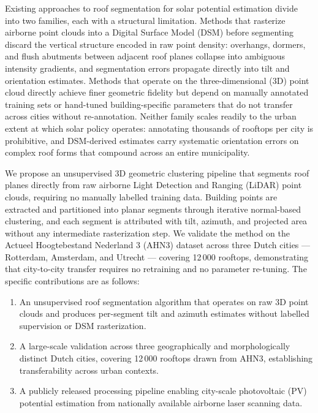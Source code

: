 Existing approaches to roof segmentation for solar potential estimation divide into two
families, each with a structural limitation.
Methods that rasterize airborne point clouds into a Digital Surface Model (DSM) before
segmenting \citep{Jakubiec2013, Freitas2015, Bergamasco2018} discard the vertical structure
encoded in raw point density: overhangs, dormers, and flush abutments between adjacent roof
planes collapse into ambiguous intensity gradients, and segmentation errors propagate directly
into tilt and orientation estimates.
Methods that operate on the three-dimensional (3D) point cloud directly \citep{Awrangjeb2014,
Verma2006, Sampath2010} achieve finer geometric fidelity but depend on manually annotated
training sets or hand-tuned building-specific parameters that do not transfer across cities
without re-annotation.
Neither family scales readily to the urban extent at which solar policy operates: annotating
thousands of rooftops per city is prohibitive, and DSM-derived estimates carry systematic
orientation errors on complex roof forms that compound across an entire municipality.

We propose an unsupervised 3D geometric clustering pipeline that segments roof planes directly
from raw airborne Light Detection and Ranging (LiDAR) point clouds, requiring no manually
labelled training data.
Building points are extracted and partitioned into planar segments through iterative
normal-based clustering, and each segment is attributed with tilt, azimuth, and projected
area without any intermediate rasterization step.
We validate the method on the Actueel Hoogtebestand Nederland 3 (AHN3) dataset across three
Dutch cities --- Rotterdam, Amsterdam, and Utrecht --- covering 12\,000 rooftops, demonstrating
that city-to-city transfer requires no retraining and no parameter re-tuning.
The specific contributions are as follows:
%
\begin{enumerate}
  \item An unsupervised roof segmentation algorithm that operates on raw 3D point clouds and
        produces per-segment tilt and azimuth estimates without labelled supervision or DSM
        rasterization.
  \item A large-scale validation across three geographically and morphologically distinct Dutch
        cities, covering 12\,000 rooftops drawn from AHN3, establishing transferability across
        urban contexts.
  \item A publicly released processing pipeline enabling city-scale photovoltaic (PV) potential
        estimation from nationally available airborne laser scanning data.
\end{enumerate}

